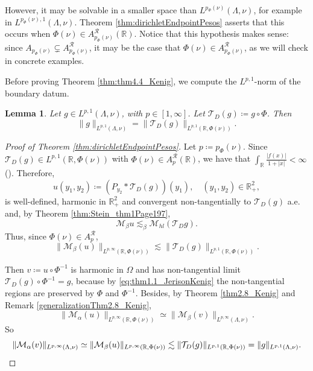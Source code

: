 \documentclass[12pt]{amsart}
\newcommand{\R}{\mathbb{R}}
\theoremstyle{plain}
\newtheorem{lemma}[theorem]{Lemma}
\theoremstyle{definition}
\numberwithin{equation}{section}
\begin{document}
However, it may be solvable in a smaller space than $L^{p_{\Phi}(\nu)}(\Lambda, \nu)$, for example in $L^{p_{\Phi}(\nu),1}(\Lambda,\nu)$. Theorem \ref{thm:dirichletEndpointPesos} asserts that this occurs when $\Phi(\nu)\in A_{p_{\Phi}(\nu)}^{\mathcal{R}}(\R)$. Notice that this hypothesis makes sense: since $A_{p_{\Phi}(\nu)}\subsetneq A_{p_{\Phi}(\nu)}^{\mathcal{R}}$, it may be the case that $\Phi(\nu)\in A_{p_{\Phi}(\nu)}^{\mathcal{R}}$, as we will check in concrete examples. 


Before proving Theorem \ref{thm:thm4.4_Kenig}, we compute the $L^{p,1}$-norm of the boundary datum. 
 

\begin{lemma}\label{lemma:equivalenciaNormaLp1DirichletPesoNu}
Let $g\in L^{p,1}(\Lambda,\nu)$, with $p\in [1,\infty]$. Let $\mathcal{T}_{D}(g)\coloneqq g\circ\Phi$. Then
\[
\|g\|_{L^{p,1}(\Lambda,\nu)}
=
\|\mathcal{T}_{D}(g)\|_{L^{p,1}(\R,\Phi(\nu))}.
\]
\end{lemma}



\begin{proof}[Proof of Theorem \ref{thm:dirichletEndpointPesos}]
Let $p\coloneqq p_{\Phi}(\nu)$. Since $\mathcal{T}_{D}(g)\in L^{p,1}(\R,\Phi(\nu))$ with $\Phi(\nu)\in A_{p}^{\mathcal{R}}(\R)$, we have that  $\int_{\R}\frac{|f(x)|}{1+|x|}<\infty$  (\cite{CNO}). Therefore,
\[
u(y_1,y_2)
\coloneqq 
(P_{y_2}\ast \mathcal{T}_{D}(g))(y_1),\quad (y_1,y_2)\in\R_{+}^{2},
\]
is well-defined, harmonic in $\R_{+}^{2}$ and convergent non-tangentially to $\mathcal{T}_{D}(g)$ a.e. and, by Theorem \ref{thm:Stein_thm1Page197},
\[
\mathcal{M}_{\beta}u
\lesssim_{\beta}
\mathcal{M}_{hl}(\mathcal{T}_{D}g).
\] 
Thus, since $\Phi(\nu)\in A_{p}^{\mathcal{R}}$,
\[
\|\mathcal{M}_{\beta}(u)\|_{L^{p,\infty}(\R,\Phi(\nu))}
\lesssim
\|\mathcal{T}_{D}(g)\|_{L^{p,1}(\R,\Phi(\nu))}.
\]

Then $v\coloneqq u\circ\Phi^{-1}$ is harmonic in $\Omega$ and has non-tangential limit $\mathcal{T}_{D}(g)\circ\Phi^{-1}=g$, because by \eqref{eq:thm1.1_JerisonKenig} the non-tangential regions are preserved by $\Phi$ and $\Phi^{-1}$. Besides, by Theorem \ref{thm2.8_Kenig} and Remark \ref{generalizationThm2.8_Kenig}, 
\begin{equation}\label{equivalenceNonTangential1}
\|\mathcal{M}_{\alpha}(u)\|_{L^{p,\infty}(\R,\Phi(\nu))}
\simeq 
\|\mathcal{M}_{\beta}(v)\|_{L^{p,\infty}(\Lambda, \nu)}.    
\end{equation}
So
\[
\|\mathcal{M}_{\alpha}(v)\|_{L^{p,\infty}(\Lambda, \nu)}
\simeq 
\|\mathcal{M}_{\beta}(u)\|_{L^{p,\infty}(\R,\Phi(\nu))}
\lesssim 
\|\mathcal{T}_{D}(g)\|_{L^{p,1}(\R,\Phi(\nu))}
=
\|g\|_{L^{p,1}(\Lambda,\nu)}.\qedhere
\]
\end{proof}
\end{document}
